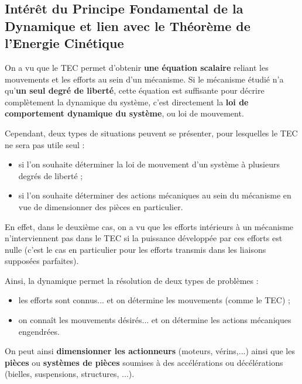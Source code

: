 \documentclass[12pt]{article}
\begin{document}
\subsection{Intérêt du Principe Fondamental de la Dynamique et lien avec le Théorème de l'Energie Cinétique}

On a vu que le TEC permet d'obtenir \textbf{une équation scalaire} reliant les mouvements et les efforts au sein d'un mécanisme. Si le mécanisme étudié n'a qu'\textbf{un seul degré de liberté}, cette équation est suffisante pour décrire complètement la dynamique du système, c'est directement la \textbf{loi de comportement dynamique du système}, ou loi de mouvement.


Cependant, deux types de situations peuvent se présenter, pour lesquelles le TEC ne sera pas utile seul :
\begin{itemize}
\item si l'on souhaite déterminer la loi de mouvement d'un système à plusieurs degrés de liberté ;
\item si l'on souhaite déterminer des actions mécaniques au sein du mécanisme en vue de dimensionner des pièces en particulier.
\end{itemize}

En effet, dans le deuxième cas, on a vu que les efforts intérieurs à un mécanisme n'interviennent pas dans le TEC si la puissance développée par ces efforts est nulle (c'est le cas en particulier pour les efforts transmis dans les liaisons supposées parfaites).

\noindent Ainsi, la dynamique permet la résolution de deux types de problèmes :
\begin{itemize}
\item les efforts sont connus... et on détermine les mouvements (comme le TEC) ;
\item on connaît les mouvements désirés... et on détermine les actions mécaniques engendrées.
\end{itemize}

On peut ainsi \textbf{dimensionner les actionneurs} (moteurs, vérins,...) ainsi que les \textbf{pièces} ou \textbf{systèmes de pièces} soumises à des accélérations ou décélérations (bielles, suspensions, structures, ...).
\end{document}
